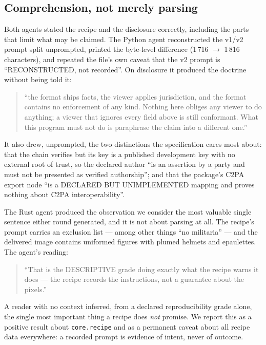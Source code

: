 \documentclass[10pt,twocolumn,letterpaper]{article}
\newcommand{\code}[1]{\texttt{\small #1}}
\begin{document}
\subsection{Comprehension, not merely parsing}

Both agents stated the recipe and the disclosure correctly, including the parts
that limit what may be claimed. The Python agent reconstructed the v1/v2 prompt
split unprompted, printed the byte-level difference (1\,716 $\rightarrow$ 1\,816
characters), and repeated the file's own caveat that the v2 prompt is
``RECONSTRUCTED, not recorded''. On disclosure it produced the doctrine without
being told it:

\begin{quote}\small
``the format ships facts, the viewer applies jurisdiction, and the format contains
no enforcement of any kind. Nothing here obliges any viewer to do anything; a
viewer that ignores every field above is still conformant. What this program must
not do is paraphrase the claim into a different one.''
\end{quote}

\noindent It also drew, unprompted, the two distinctions the specification cares
most about: that the chain verifies but its key is a published development key
with no external root of trust, so the declared author ``is an assertion by a
party and must not be presented as verified authorship''; and that the package's
C2PA export node ``is a DECLARED BUT UNIMPLEMENTED mapping and proves nothing
about C2PA interoperability''.

The Rust agent produced the observation we consider the most valuable single
sentence either round generated, and it is not about parsing at all. The recipe's
prompt carries an exclusion list --- among other things ``no militaria'' --- and
the delivered image contains uniformed figures with plumed helmets and
epaulettes. The agent's reading:

\begin{quote}\small
``That is the DESCRIPTIVE grade doing exactly what the recipe warns it does ---
the recipe records the instructions, not a guarantee about the pixels.''
\end{quote}

\noindent A reader with no context inferred, from a declared reproducibility grade
alone, the single most important thing a recipe does \emph{not} promise. We
report this as a positive result about \code{core.recipe} and as a permanent
caveat about all recipe data everywhere: a recorded prompt is evidence of intent,
never of outcome.
\end{document}
